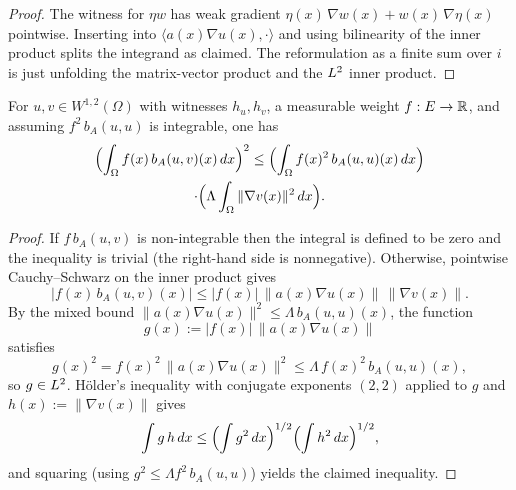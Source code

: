 \begin{proof}
\leanok

The witness for $\eta w$ has weak gradient $\eta(x)\,\nabla w(x) + w(x)\,\nabla \eta(x)$ pointwise. Inserting into $\langle a(x)\nabla u(x), \cdot\rangle$ and using bilinearity of the inner product splits the integrand as claimed. The reformulation as a finite sum over $i$ is just unfolding the matrix-vector product and the $L^{2}$ inner product.
\end{proof}

\begin{theorem}
\label{thm:bilinForm_weighted_cauchySchwarz}
\leanok
{}
For $u, v \in W^{1,2}(\Omega)$ with witnesses $h_u, h_v$, a measurable weight $f : E \to \mathbb{R}$, and assuming $f^{2}\,b_A(u,u)$ is integrable, one has
\begin{multline*}
  \Bigl(\int_{\Omega} f(x)\,b_A(u,v)(x)\,dx\Bigr)^{2}
  \leq \Bigl(\int_{\Omega} f(x)^{2}\,b_A(u,u)(x)\,dx\Bigr)\\
  \cdot \Bigl(\Lambda \int_{\Omega} \|\nabla v(x)\|^{2}\,dx\Bigr).
\end{multline*}
\end{theorem}

\begin{proof}
\leanok
{}

If $f\,b_A(u,v)$ is non-integrable then the integral is defined to be zero and the inequality is trivial (the right-hand side is nonnegative). Otherwise, point\-wise Cauchy--Schwarz on the inner product gives
\begin{equation*}
  |f(x)\,b_A(u,v)(x)| \leq |f(x)|\,\|a(x)\nabla u(x)\|\,\|\nabla v(x)\|.
\end{equation*}
By the mixed bound
$\|a(x)\nabla u(x)\|^{2} \leq \Lambda\,b_A(u,u)(x)$,
the function
\begin{equation*}
  g(x) := |f(x)|\,\|a(x)\nabla u(x)\|
\end{equation*}
satisfies
\begin{equation*}
  g(x)^{2} = f(x)^{2}\,\|a(x)\nabla u(x)\|^{2} \leq \Lambda\,f(x)^{2}\,b_A(u,u)(x),
\end{equation*}
so $g \in L^{2}$. H\"older's inequality with conjugate exponents $(2,2)$ applied to $g$ and $h(x) := \|\nabla v(x)\|$ gives
\begin{equation*}
  \int g\,h\,dx \leq \Bigl(\int g^{2}\,dx\Bigr)^{1/2}\Bigl(\int h^{2}\,dx\Bigr)^{1/2},
\end{equation*}
and squaring (using $g^{2} \leq \Lambda f^{2}\,b_A(u,u)$) yields the claimed inequality.
\end{proof}

